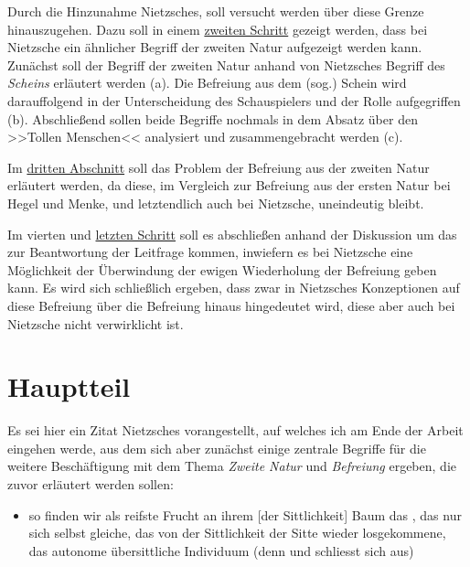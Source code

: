 \documentclass[12pt, a4paper, openany]{report}
\begin{document}
Durch die Hinzunahme Nietzsches, soll versucht werden über diese Grenze hinauszugehen.
Dazu soll in einem \hyperref[abschnitt_2]{zweiten Schritt} gezeigt werden, dass bei Nietzsche ein ähnlicher Begriff der zweiten Natur aufgezeigt werden kann.
Zunächst soll der Begriff der zweiten Natur anhand von Nietzsches Begriff des \textit{Scheins} erläutert werden (a).
Die Befreiung aus dem (sog.) Schein wird darauffolgend in der Unterscheidung des Schauspielers und der Rolle aufgegriffen (b). 
Abschließend sollen beide Begriffe nochmals in dem Absatz über den >>Tollen Menschen<< analysiert und zusammengebracht werden (c).

Im \hyperref[abschnitt_3]{dritten Abschnitt} soll das Problem der Befreiung aus der zweiten Natur erläutert werden, da diese, im Vergleich zur Befreiung aus der ersten Natur bei Hegel und Menke, und letztendlich auch bei Nietzsche, uneindeutig bleibt.

Im vierten und \hyperref[abschnitt_4]{letzten Schritt} soll es abschließen anhand der Diskussion um das  zur Beantwortung der Leitfrage kommen, inwiefern es bei Nietzsche eine Möglichkeit der Überwindung der ewigen Wiederholung der Befreiung geben kann. 
Es wird sich schließlich ergeben, dass zwar in Nietzsches Konzeptionen auf diese Befreiung über die Befreiung hinaus hingedeutet wird, diese aber auch bei Nietzsche nicht verwirklicht ist.


\chapter{Hauptteil}

Es sei hier ein Zitat Nietzsches vorangestellt, auf welches ich am Ende der Arbeit eingehen werde, aus dem sich aber zunächst einige zentrale Begriffe für die weitere Beschäftigung mit dem Thema \emph{Zweite Natur} und \emph{Befreiung} ergeben, die zuvor erläutert werden sollen:
\begin{itemize}
    \item[] \textelp{} so finden wir als reifste Frucht an ihrem [der Sittlichkeit] Baum das  , das nur sich selbst gleiche, das von der Sittlichkeit der Sitte wieder losgekommene, das autonome übersittliche Individuum (denn  und  schliesst sich aus) \textelp{} 
\end{itemize}
\end{document}
